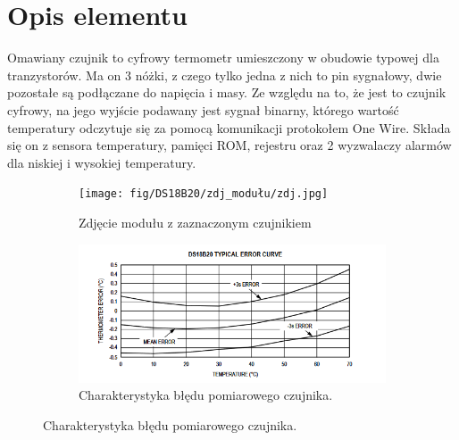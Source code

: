 \documentclass[11pt, a4paper]{article}
\author{Anna Nasierowska}
\begin{document}
%
%
\newpage

\section*{Opis elementu}
Omawiany czujnik to cyfrowy termometr umieszczony w obudowie typowej dla tranzystorów. Ma on 3 nóżki, z czego tylko jedna z nich to pin sygnałowy, dwie pozostałe są podłączane do napięcia i masy. Ze względu na to, że jest to czujnik cyfrowy, na jego wyjście podawany jest sygnał binarny, którego wartość temperatury odczytuje się za pomocą komunikacji protokołem One Wire. Składa się on z sensora temperatury, pamięci ROM, rejestru oraz 2 wyzwalaczy alarmów dla niskiej i wysokiej temperatury. 

\vspace{0.25cm}
\begin{figure}[h]
\centering
\begin{subfigure}{.5\textwidth}
\centering
\texttt{[image: fig/DS18B20/zdj\_modułu/zdj.jpg]}
\caption{Zdjęcie modułu z zaznaczonym czujnikiem}
\label{fig:_zdjecie_elementu}
\end{subfigure}%
\begin{subfigure}{.5\textwidth}
\centering
\includegraphics[width=\linewidth]{fig/DS18B20/zasada_dzialania/char.png}
\caption{Charakterystyka błędu pomiarowego czujnika.}
\label{fig:_zasada_dzialania_elementu}
\end{subfigure}
\label{fig:element}
\end{figure}
\vspace{0.25cm}
\end{document}
